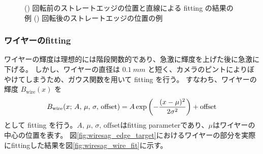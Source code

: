 \documentclass[../../main.tex]{subfiles}
\begin{document}
\begin{figure}[H]
\begin{minipage}[b]{0.5\hsize}
        \subcaption{}
        \label{fig:wiresag_straight_edge_positions_rot}
    \end{minipage}
    \caption{() 回転前のストレートエッジの位置と直線による fitting の結果の例
             () 回転後のストレートエッジの位置の例
             }
    \label{fig:wiresag_straight_edge}
\end{figure}

\subsubsection{ワイヤーのfitting}
ワイヤーの輝度は理想的には階段関数的であり、急激に輝度を上げた後に急激に下げる。
しかし、ワイヤーの直径は $\SI{0.1}{mm}$ と短く、カメラのピントによりぼやけてしまうため、ガウス関数を用いて fitting を行う。
すなわち、ワイヤーの輝度 $B_{\mathrm{wire}}(x)$ を
\begin{align}
    B_{\mathrm{wire}}(x;\,A,\,\mu,\,\sigma,\,\text{offset}) = A\exp\qty(-\dfrac{(x-\mu)^2}{2\sigma^2}) + \mathrm{offset}
\end{align}
として fitting を行う。$A,\,\mu,\,\sigma,\,\text{offset}$はfitting parameterであり、$\mu$はワイヤーの中心の位置を表す。
図\ref{fig:wiresag_edge_target}におけるワイヤーの部分を実際にfittingした結果を図\ref{fig:wiresag_wire_fit}に示す。
\end{document}
